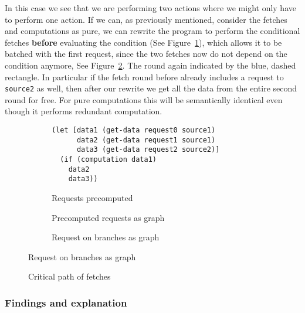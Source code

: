 In this case we see that we are performing two actions where we might only have to perform one action.
If we can, as previously mentioned, consider the fetches and computations as pure, we can rewrite the program to perform the conditional fetches \textbf{before} evaluating the condition (See Figure~\ref{fig:requests-precomputed}), which allows it to be batched with the first request, since the two fetches now do not depend on the condition anymore, See Figure~\ref{fig:requests-precomputed-graph}.
The round again indicated by the blue, dashed rectangle.
In particular if the fetch round before already includes a request to \texttt{source2} as well, then after our rewrite we get all the data from the entire second round for free.
For pure computations this will be semantically identical even though it performs redundant computation.

\begin{figure}[h]

  \begin{subfigure}{\textwidth}
\begin{verbatim}
(let [data1 (get-data request0 source1)
      data2 (get-data request1 source1)
      data3 (get-data request2 source2)]
  (if (computation data1)
    data2
    data3))
\end{verbatim}
    \caption{Requests precomputed}
    \label{fig:requests-precomputed}
  \end{subfigure}

  \begin{subfigure}{0.7\textwidth}
    \caption{Precomputed requests as graph}
    \label{fig:requests-precomputed-graph}
  \end{subfigure}
  \begin{subfigure}{.7\textwidth}
    \caption{Request on branches as graph}
    \label{fig:requests-on-branches-graph}
  \end{subfigure}
\end{figure}

\begin{figure}[h]
    \caption{Critical path of fetches}
    \label{fig:critical-path}
\end{figure}

\subsubsection{Findings and explanation}

